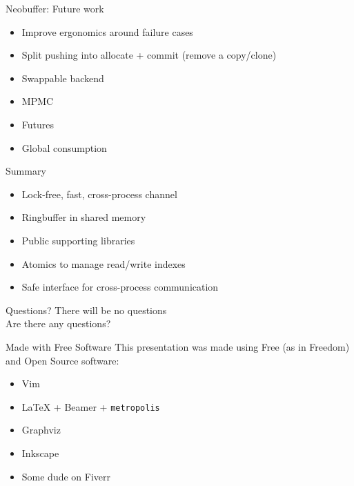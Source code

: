 \documentclass[aspectratio=43]{beamer}
\begin{document}
\begin{frame}{Neobuffer: Future work}
    \begin{itemize}
        \item<1-> Improve ergonomics around failure cases
        \item<2-> Split pushing into allocate + commit (remove a copy/clone)
        \item<3-> Swappable backend
        \item<4-> MPMC
        \item<5-> Futures
        \item<6-> Global consumption
    \end{itemize}
\end{frame}

\begin{frame}{Summary}
    \begin{itemize}
        \item<1-> Lock-free, fast, cross-process channel
        \item<2-> Ringbuffer in shared memory
        \item<3-> Public supporting libraries
        \item<4-> Atomics to manage read/write indexes
        \item<5-> Safe interface for cross-process communication
    \end{itemize}
\end{frame}


\begin{frame}{Questions?}
    \centering
    \Huge{There will be no questions}\\
    \centering
    \Large{Are there any questions?}
\end{frame}
\begin{frame}{Made with Free Software}
    This presentation was made using Free (as in Freedom) and Open Source
    software:
    \begin{itemize}
        \item Vim
        \item \LaTeX{} + Beamer + \texttt{metropolis}
        \item Graphviz
        \item Inkscape
        \item Some dude on Fiverr
    \end{itemize}
\end{frame}
\end{document}

